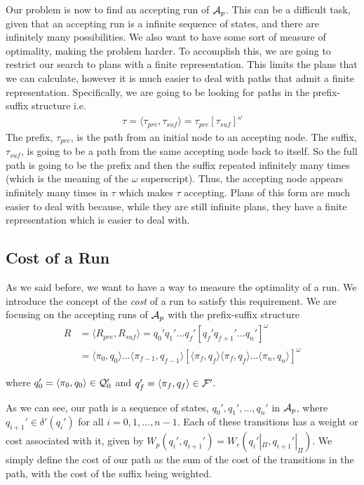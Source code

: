 Our problem is now to find an accepting run of $\mathcal{A}_p$. This can be a difficult task, given that an accepting run is a infinite sequence of states, and there are infinitely many possibilities. We also want to have some sort of measure of optimality, making the problem harder. To accomplish this, we are going to restrict our search to plans with a finite representation. This limits the plans that we can calculate, however it is much easier to deal with paths that admit a finite representation. Specifically, we are going to be looking for paths in the prefix-suffix structure i.e.\
\begin{align*}
\tau = \langle \tau_{pre}, \tau_{suf} \rangle = \tau_{pre} [\tau_{suf}]^\omega
\end{align*}
The prefix, $\tau_{pre}$, is the path from an initial node to an accepting node. The suffix, $\tau_{suf}$, is going to be a path from the same accepting node back to itself. So the full path is going to be the prefix and then the suffix repeated infinitely many times (which is the meaning of the $\omega$ superscript). Thus, the accepting node appears infinitely many times in $\tau$ which makes $\tau$ accepting. Plans of this form are much easier to deal with because, while they are still infinite plans, they have a finite representation which is easier to deal with.

\subsection{Cost of a Run}
As we said before, we want to have a way to measure the optimality of a run. We introduce the concept of the \textit{cost} of a run to satisfy this requirement. We are focusing on the accepting runs of $\mathcal{A}_p$ with the prefix-suffix structure
\begin{align*}
R &= \langle R_{pre}, R_{suf} \rangle = q_0' q_1' \dots q_f' [q_f' q_{f+1}' \dots q_n']^\omega \\
&= \langle \pi_0, q_0 \rangle \dots \langle \pi_{f-1}, q_{f-1} \rangle [ \langle \pi_f , q_f \rangle \langle \pi_f , q_f \rangle \dots \langle \pi_{n}, q_n \rangle ]^\omega
\end{align*} 

where $q_0' = \langle \pi_0, q_0 \rangle \in \mathcal{Q}_0'$ and $q_f' = \langle \pi_f , q_f \rangle \in \mathcal{F}'$. 

As we can see, our path is a sequence of states, $q_0',q_1',\dots,q_n'$ in $\mathcal{A}_p$, where $q_{i+1}' \in \delta' (q_i')$ for all $i=0,1, \dots, n-1$. Each of these transitions has a weight or cost associated with it, given by $W_p(q_i',q_{i+1}') = W_c(q_i'|_\Pi , q_{i+1}'|_\Pi)$. We simply define the cost of our path as the sum of the cost of the transitions in the path, with the cost of the suffix being weighted.

